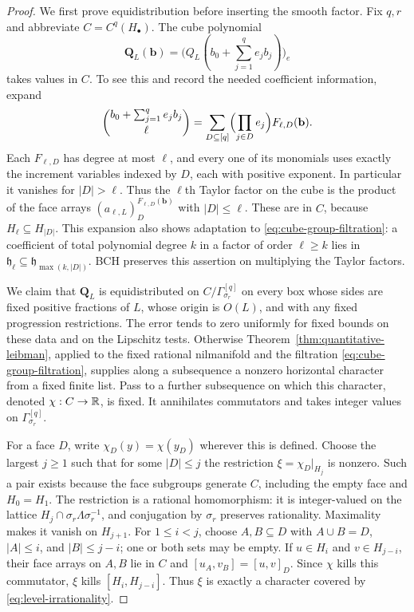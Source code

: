 \begin{proof}
We first prove equidistribution before inserting the smooth factor.  Fix
$q,r$ and abbreviate $C=C^q(H_\bullet)$.  The cube polynomial
\[
 \mathbf Q_L(\mathbf b)
 =\bigl(Q_L(b_0+\textstyle\sum_{j=1}^q e_jb_j)\bigr)_e
\]
takes values in $C$.  To see this and record the needed coefficient
information, expand
\begin{equation}
 \binom{b_0+\sum_{j=1}^q e_jb_j}{\ell}
 =\sum_{D\subseteq[q]}
      \Bigl(\prod_{j\in D}e_j\Bigr)F_{\ell,D}(\mathbf b).
 \label{eq:boolean-binomial-expansion}
\end{equation}
Each $F_{\ell,D}$ has degree at most $\ell$, and every one of its
monomials uses exactly the increment variables indexed by $D$, each with
positive exponent.  In particular it vanishes for $|D|>\ell$.
Thus the $\ell$th Taylor factor on the cube is the product of the face
arrays $(a_{\ell,L})_D^{F_{\ell,D}(\mathbf b)}$ with $|D|\leq\ell$.
These are in $C$, because $H_\ell\subseteq H_{|D|}$.  This expansion
also shows adaptation to \eqref{eq:cube-group-filtration}: a coefficient
of total polynomial degree $k$ in a factor of order $\ell\geq k$ lies
in $\mathfrak h_\ell\subseteq\mathfrak h_{\max(k,|D|)}$.
BCH preserves this assertion on multiplying the Taylor factors.

We claim that $\mathbf Q_L$ is equidistributed on
$C/\Gamma^{[q]}_{\sigma_r}$ on every box whose sides are fixed positive
fractions of $L$, whose origin is $O(L)$, and with any fixed progression
restrictions.  The error tends to zero uniformly for fixed bounds on
these data and on the Lipschitz tests.  Otherwise
Theorem~\ref{thm:quantitative-leibman}, applied to the fixed rational
nilmanifold and the filtration \eqref{eq:cube-group-filtration}, supplies
along a subsequence a nonzero horizontal character from a fixed finite
list.  Pass to a further subsequence on which this character, denoted
$\chi:C\to\mathbb R$, is fixed.  It annihilates commutators and takes integer
values on $\Gamma^{[q]}_{\sigma_r}$.

For a face $D$, write $\chi_D(y)=\chi(y_D)$ wherever this is defined.
Choose the largest $j\geq1$ such that for some $|D|\leq j$ the
restriction
$\xi=\chi_D|_{H_j}$ is nonzero.  Such a pair exists because the face
subgroups generate $C$, including the empty face and $H_0=H_1$.
The restriction is a rational homomorphism: it is integer-valued on the
lattice $H_j\cap\sigma_r\Lambda\sigma_r^{-1}$, and conjugation by
$\sigma_r$ preserves rationality.  Maximality makes it vanish on
$H_{j+1}$.  For $1\leq i<j$, choose $A,B\subseteq D$ with
$A\cup B=D$, $|A|\leq i$, and $|B|\leq j-i$; one or both sets may
be empty.  If $u\in H_i$ and $v\in H_{j-i}$, their face arrays on
$A,B$ lie in $C$ and
$[u_A,v_B]=[u,v]_D$.  Since $\chi$ kills this commutator, $\xi$ kills
$[H_i,H_{j-i}]$.  Thus $\xi$ is exactly a character covered by
\eqref{eq:level-irrationality}.


\end{proof}

